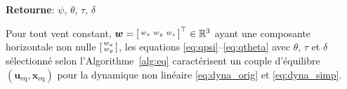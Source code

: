 \begin{algorithm}
\begin{algorithmic}[1]
    \end{algorithmic}
    \hspace*{.1cm} \textbf{Retourne}:  $\psi$, $\theta$, $\tau$, $\delta$
    \end{algorithm}


    \begin{theorem}\label{thm:eqs}
    Pour tout vent constant, $\boldsymbol{w} =\left[ \begin{smallmatrix}w_x & w_y & w_z \end{smallmatrix} \right]^\top \in {\mathbb R}^3$ ayant une composante horizontale non nulle $\left[ \begin{smallmatrix}w_x \\ w_y \end{smallmatrix} \right]$,
    les equations \eqref{eq:qpsi}--\eqref{eq:qtheta} avec $\theta$, $\tau$ et $\delta$ sélectionné selon l'Algorithme~\ref{alg:eq} caractérisent un couple d'équilibre $(\boldsymbol{u}_{\text{eq}}, \boldsymbol{x}_{\text{eq}})$ pour la dynamique non linéaire \eqref{eq:dyna_orig} et \eqref{eq:dyna_simp}.
    
    \end{theorem}
    
